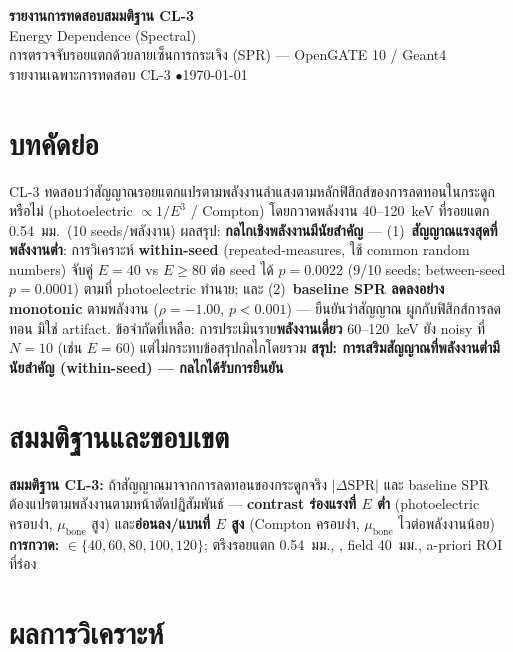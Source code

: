 \documentclass[14pt]{extarticle}
\newcommand{\code}[1]{{\ttfamily\detokenize{#1}}}
\begin{document}
\begin{center}
{\LARGE\bfseries\color{theme} รายงานการทดสอบสมมติฐาน CL-3}\\[3pt]
{\Large Energy Dependence (Spectral)}\\[5pt]
{\small การตรวจจับรอยแตกด้วยลายเซ็นการกระเจิง (SPR) --- OpenGATE 10 / Geant4}\\
{\small รายงานเฉพาะการทดสอบ CL-3 \quad$\bullet$\quad \today}
\end{center}
\vspace{2pt}{\color{theme!45}\hrule}\vspace{8pt}

\section*{บทคัดย่อ}
CL-3 ทดสอบว่าสัญญาณรอยแตกแปรตามพลังงานลำแสงตามหลักฟิสิกส์ของการลดทอนในกระดูกหรือไม่
(photoelectric $\propto 1/E^{3}$ / Compton) โดยกวาดพลังงาน 40--120~keV ที่รอยแตก 0.54~มม.\ (10 seeds/พลังงาน)
ผลสรุป: \textbf{กลไกเชิงพลังงานมีนัยสำคัญ} --- (1)~\textbf{สัญญาณแรงสุดที่พลังงานต่ำ}: การวิเคราะห์
\textbf{within-seed} (repeated-measures, ใช้ common random numbers) จับคู่ $E{=}40$ vs $E{\ge}80$ ต่อ seed
ได้ \textbf{$p=0.0022$} (9/10 seeds; between-seed $p=0.0001$) ตามที่ photoelectric ทำนาย; และ
(2)~\textbf{baseline SPR ลดลงอย่าง monotonic} ตามพลังงาน ($\rho=-1.00$, $p<0.001$) --- ยืนยันว่าสัญญาณ
ผูกกับฟิสิกส์การลดทอน มิใช่ artifact. ข้อจำกัดที่เหลือ: การประเมินราย\textbf{พลังงานเดี่ยว} 60--120~keV ยัง
noisy ที่ $N=10$ (เช่น $E=60$) แต่ไม่กระทบข้อสรุปกลไกโดยรวม
\textbf{สรุป: การเสริมสัญญาณที่พลังงานต่ำมีนัยสำคัญ (within-seed) --- กลไกได้รับการยืนยัน}

\section{สมมติฐานและขอบเขต}
\textbf{สมมติฐาน CL-3:} ถ้าสัญญาณมาจากการลดทอนของกระดูกจริง $|\Delta\mathrm{SPR}|$ และ baseline SPR
ต้องแปรตามพลังงานตามหน้าตัดปฏิสัมพันธ์ --- \textbf{contrast ร่องแรงที่ $E$ ต่ำ} (photoelectric ครอบงำ,
$\mu_{\text{bone}}$ สูง) และ\textbf{อ่อนลง/แบนที่ $E$ สูง} (Compton ครอบงำ, $\mu_{\text{bone}}$ ไวต่อพลังงานน้อย)\\
\textbf{การกวาด:} \code{energy_keV} $\in\{40,60,80,100,120\}$; ตรึงรอยแตก 0.54~มม., \code{n_seeds=10},
field 40~มม., a-priori ROI ที่ร่อง

\section{ผลการวิเคราะห์}
\end{document}
